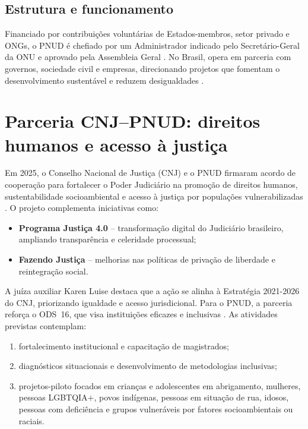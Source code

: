 \subsection{Estrutura e funcionamento}
Financiado por contribuições voluntárias de Estados-membros, setor privado e
ONGs, o PNUD é chefiado por um Administrador indicado pelo Secretário-Geral da
ONU e aprovado pela Assembleia Geral \cite{undp2025onu}. No Brasil, opera em
parceria com governos, sociedade civil e empresas, direcionando projetos que
fomentam o desenvolvimento sustentável e reduzem desigualdades
\cite{undp2025sobre}.

\section{Parceria CNJ–PNUD: direitos humanos e acesso à justiça}
\label{sec:cnj-pnud}

Em 2025, o Conselho Nacional de Justiça (CNJ) e o PNUD firmaram acordo de
cooperação para fortalecer o Poder Judiciário na promoção de direitos humanos,
sustentabilidade socioambiental e acesso à justiça por populações
vulnerabilizadas \cite{undp2025pnudcnj}. O projeto complementa iniciativas como:
\begin{itemize}
  \item \textbf{Programa Justiça 4.0} – transformação digital do Judiciário
        brasileiro, ampliando transparência e celeridade processual;
  \item \textbf{Fazendo Justiça} – melhorias nas políticas de privação de
        liberdade e reintegração social.
\end{itemize}

A juíza auxiliar Karen Luise destaca que a ação se alinha à Estratégia 2021-2026
do CNJ, priorizando igualdade e acesso jurisdicional. Para o PNUD, a parceria
reforça o ODS~16, que visa instituições eficazes e inclusivas
\cite{undp2025pnudcnj}. As atividades previstas contemplam:
\begin{enumerate}
  \item fortalecimento institucional e capacitação de magistrados;
  \item diagnósticos situacionais e desenvolvimento de metodologias inclusivas;
  \item projetos-piloto focados em crianças e adolescentes em abrigamento,
        mulheres, pessoas LGBTQIA$+$, povos indígenas, pessoas em situação de
        rua, idosos, pessoas com deficiência e grupos vulneráveis por fatores
        socioambientais ou raciais.
\end{enumerate}

